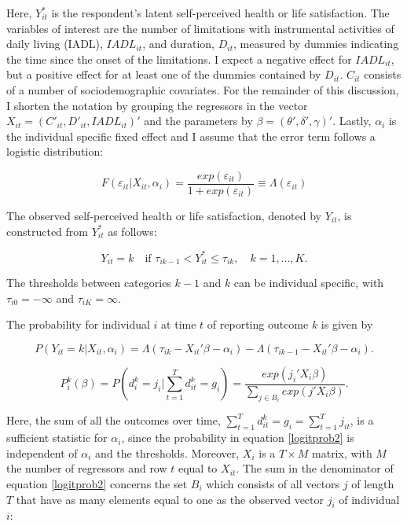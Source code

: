 \documentclass[12pt]{article}
\begin{document}
Here, $Y_{it}^*$ is the respondent's latent self-perceived health or life satisfaction. The variables of interest are the number of limitations with instrumental activities of daily living (IADL), $IADL_{it}$, and duration, $D_{it}$, measured by dummies indicating the time since the onset of the limitations. I expect a negative effect for $IADL_{it}$, but a positive effect for at least one of the dummies contained by $D_{it}$. $C_{it}$ consists of a number of sociodemographic covariates. For the remainder of this discussion, I shorten the notation by grouping the regressors in the vector $X_{it} = (C'_{it},D'_{it},IADL_{it})'$ and the parameters by $\beta = (\theta',\delta',\gamma)'$. Lastly, $\alpha_{i}$ is the individual specific fixed effect and I assume that the error term follows a logistic distribution:

\begin{equation}
    F(\varepsilon_{it}|X_{it},\alpha_{i}) = \frac{exp(\varepsilon_{it})}{1+exp(\varepsilon_{it})} \equiv \Lambda(\varepsilon_{it})
\end{equation}

The observed self-perceived health or life satisfaction, denoted by $Y_{it}$, is constructed from $Y_{it}^*$ as follows:

\begin{equation}
    Y_{it} = k \quad \textrm{if } \tau_{ik-1}<Y_{it}^*\leq\tau_{ik}, \quad k=1,\ldots,K.
\end{equation}

\noindent The thresholds between categories $k-1$ and $k$ can be individual specific, with $\tau_{i0}=-\infty$ and $\tau_{iK}=\infty$. 

The probability for individual $i$ at time $t$ of reporting outcome $k$ is given by 

\begin{equation}
    P(Y_{it}=k|X_{it},\alpha_{i}) = \Lambda(\tau_{ik}-X_{it}'\beta-\alpha_{i}) - \Lambda(\tau_{ik-1}-X_{it}'\beta-\alpha_{i}).
    \label{logitprob}
\end{equation}


\begin{equation}
    P_{i}^k(\beta) = P(d_{i}^k=j_{i}|\sum_{t=1}^{T}{d_{it}^k=g_{i}}) = \frac{exp(j_{i}'X_{i}\beta)}{\sum_{j\in B_{i}}{exp(j'X_{i}\beta)}}.
    \label{logitprob2}
\end{equation}

Here, the sum of all the outcomes over time, $\sum_{t=1}^{T}{d_{it}^k}=g_{i}=\sum_{t=1}^{T}{j_{it}}$, is a sufficient statistic for $\alpha_{i}$, since the probability in equation \ref{logitprob2} is independent of $\alpha_{i}$ and the thresholds. Moreover, $X_{i}$ is a $T\times M$ matrix, with $M$ the number of regressors and row $t$ equal to $X_{it}$. The sum in the denominator of equation \ref{logitprob2} concerns the set $B_{i}$ which consists of all vectors $j$ of length $T$ that have as many elements equal to one as the observed vector $j_{i}$ of individual $i$: 
\end{document}
